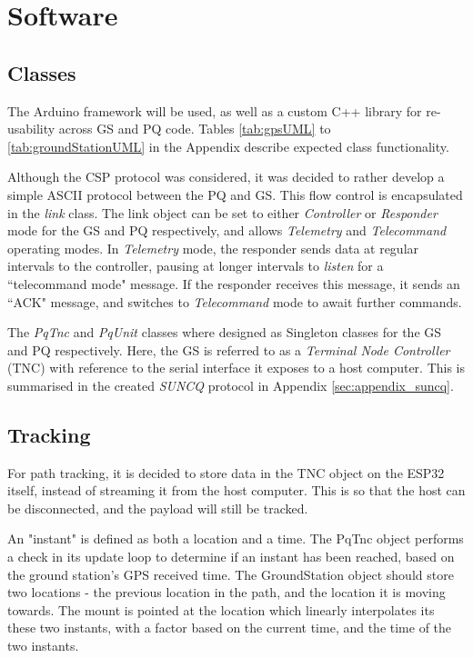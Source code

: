 \graphicspath{{./figures}}

\section{Software}

\subsection{Classes}
The Arduino framework will be used, as well as a custom C++ library for re-usability across GS and PQ code. Tables \ref{tab:gpsUML} to \ref{tab:groundStationUML} in the Appendix describe expected class functionality.

Although the CSP protocol was considered, it was decided to rather develop a simple ASCII protocol between the PQ and GS. This flow control is encapsulated in the \textit{link} class. The link object can be set to either \textit{Controller} or \textit{Responder} mode for the GS and PQ respectively, and allows \textit{Telemetry} and \textit{Telecommand} operating modes. In \textit{Telemetry} mode, the responder sends data at regular intervals to the controller, pausing at longer intervals to \textit{listen} for a ``telecommand mode" message. If the responder receives this message, it sends an ``ACK" message, and switches to \textit{Telecommand} mode to await further commands.

The \textit{PqTnc} and \textit{PqUnit} classes where designed as Singleton classes for the GS and PQ respectively. Here, the GS is referred to as a \textit{Terminal Node Controller} (TNC) with reference to the serial interface it exposes to a host computer. This is summarised in the created \textit{SUNCQ} protocol in Appendix \ref{sec:appendix_suncq}.

\subsection{Tracking}
For path tracking, it is decided to store data in the TNC object on the ESP32 itself, instead of streaming it from the host computer. This is so that the host can be disconnected, and the payload will still be tracked.

An "instant" is defined as both a location and a time. The PqTnc object performs a check in its update loop to determine if an instant has been reached, based on the ground station's GPS received time. The GroundStation object should store two locations - the previous location in the path, and the location it is moving towards. The mount is pointed at the location which linearly interpolates its these two instants, with a factor based on the current time, and the time of the two instants.

